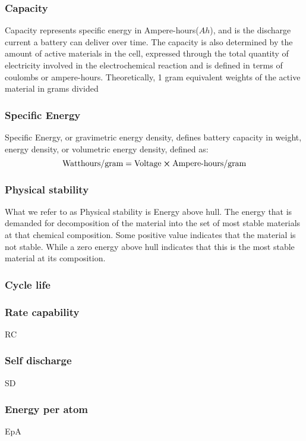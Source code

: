	\subsubsection*{Capacity}
	Capacity represents specific energy in Ampere-hours($\si{Ah}$), and is the discharge current a battery can deliver over time. 
	The capacity is also determined by the amount of active materials in the cell, expressed through the total quantity of electricity involved in the electrochemical reaction and is defined in terms of coulombs or ampere-hours. Theoretically, 1 gram equivalent weights of the active material in grams divided
	 
	\subsubsection*{Specific Energy}
	Specific Energy, or gravimetric energy density, defines battery capacity in weight, energy density, or volumetric energy density, defined as: 
	\begin{equation}
	\text{Watthours/gram} = \text{Voltage} \cross \text{Ampere-hours/gram}
	\end{equation}

	\subsubsection*{Physical stability}
	What we refer to as Physical stability is Energy above hull. The energy that is demanded for decomposition of the material into the set of most stable materials at that chemical composition. Some positive value indicates that the material is not stable. While a zero energy above hull indicates that this is the most stable material at its composition. 
	
	\subsubsection*{Cycle life}
	
	

	\subsubsection*{Rate capability}
	RC
	\subsubsection*{Self discharge}
	SD
	\subsubsection*{Energy per atom}
	EpA
